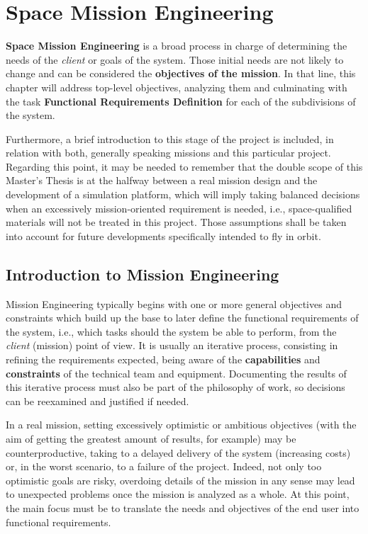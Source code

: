 \chapter{Space Mission Engineering} \label{chap:chapter2}

\textbf{Space Mission Engineering} is a broad process in charge of determining the needs of the \textit{client} or goals of the system. Those initial needs are not likely to change and can be considered the \textbf{objectives of the mission}. In that line, this chapter will address top-level objectives, analyzing them and culminating with the task \textbf{Functional Requirements Definition} for each of the subdivisions of the system. 

Furthermore, a brief introduction to this stage of the project is included, in relation with both, generally speaking missions and this particular project. Regarding this point, it may be needed to remember that the double scope of this Master's Thesis is at the halfway between a real mission design and the development of a simulation platform, which will imply taking balanced decisions when an excessively mission-oriented requirement is needed, i.e., space-qualified materials will not be treated in this project. Those assumptions shall be taken into account for future developments specifically intended to fly in orbit. 


\section{Introduction to Mission Engineering} \label{missioneng}%

Mission Engineering typically begins with one or more general objectives and constraints which build up the base to later define the functional requirements of the system, i.e., which tasks should the system be able to perform, from the \textit{client} (mission) point of view. It is usually an iterative process, consisting in refining the requirements expected, being aware of the \textbf{capabilities} and \textbf{constraints} of the technical team and equipment. 
Documenting the results of this iterative process must also be part of the philosophy of work, so decisions can be reexamined and justified if needed. 

In a real mission, setting excessively optimistic or ambitious objectives (with the aim of getting the greatest amount of results, for example) may be counterproductive, taking to a delayed delivery of the system (increasing costs) or, in the worst scenario, to a failure of the project. Indeed, not only too optimistic goals are risky, overdoing details of the mission in any sense may lead to unexpected problems once the mission is analyzed as a whole. At this point, the main focus must be to translate the needs and objectives of the end user into functional requirements.

